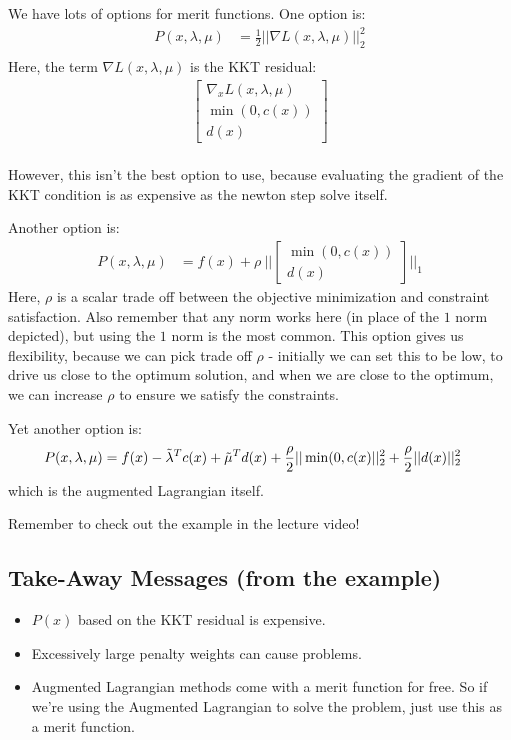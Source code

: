 \noindent
We have lots of options for merit functions. One option is:
\begin{align}
    P(x, \lambda, \mu) &= \frac{1}{2} || \nabla L(x, \lambda, \mu) ||_2^2 \\
\end{align}
Here, the term $\nabla L(x, \lambda, \mu)$ is the KKT residual:
\begin{align}
    \begin{bmatrix}
        \nabla_x L(x,\lambda,\mu) \\
        \min(0, c(x)) \\
        d(x)
    \end{bmatrix}
\end{align}\\
However, this isn't the best option to use, because evaluating the gradient of the KKT condition is as expensive as the newton step solve itself.

\noindent
Another option is:
\begin{align}
    P(x,\lambda, \mu) &= f(x) + \rho \ || \begin{bmatrix}
        \min (0,c(x)) \\
        d(x)
    \end{bmatrix} ||_1
\end{align}
Here, $\rho$ is a scalar trade off between the objective minimization and constraint satisfaction. Also remember that any norm works here (in place of the $1$ norm depicted), but using the $1$  norm is the most common.
This option gives us flexibility, because we can pick trade off $\rho$ - initially we can set this to be low, to drive us close to the optimum solution, and when we are close to the optimum, we can increase $\rho$ to ensure we satisfy the constraints.

Yet another option is:
\begin{align}
    P(x, \lambda, \mu) &= f(x) - \Tilde{\lambda}^T c(x) + \Tilde{\mu}^T d(x) + \frac{\rho}{2} || \min(0,c(x) ||_2^2 + \frac{\rho}{2} || d(x) ||_2^2
\end{align}
which is the augmented Lagrangian itself.

\noindent
Remember to check out the example in the lecture video!

\subsection{Take-Away Messages (from the example)}
\begin{itemize}
    \item $P(x)$ based on the KKT residual is expensive.
    \item Excessively large penalty weights can cause problems.
    \item Augmented Lagrangian methods come with a merit function for free. So if we're using the Augmented Lagrangian to solve the problem, just use this as a merit function.
\end{itemize}



